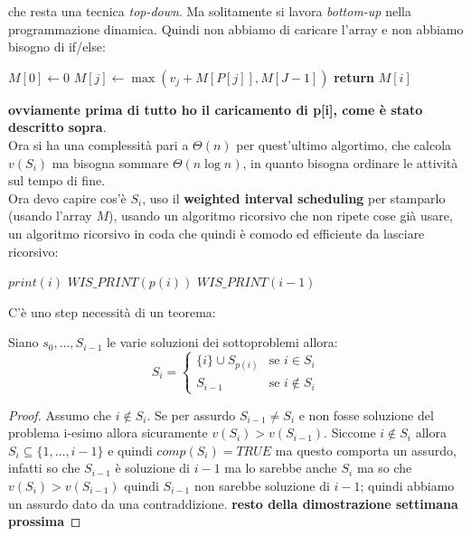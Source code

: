 \documentclass[a4paper,12pt, oneside]{book}
\begin{document}
che resta una tecnica \textit{top-down}. Ma solitamente si lavora
\textit{bottom-up} nella programmazione dinamica. Quindi non abbiamo
di caricare l'array e non abbiamo bisogno di if/else:
\begin{algorithm}
  \begin{algorithmic}
    \State $M[0]\gets 0$
    \State $M[j]\gets\max(v_j+M[P[j]], M[J-1])$
    \EndFor
    \State \textbf{return} $M[i]$
    \EndFunction
  \end{algorithmic}  
\end{algorithm}
\textbf{ovviamente prima di tutto ho il caricamento di p[i], come è
  stato descritto sopra}.\\
Ora si ha una complessità pari a $\Theta(n)$ per quest'ultimo
algortimo, che calcola $v(S_i)$ ma bisogna sommare $\Theta(n\log n)$,
in quanto bisogna ordinare le attività sul tempo di fine.\\
Ora devo capire cos'è $S_i$, uso il \textbf{weighted interval
  scheduling} per stamparlo (usando l'array $M$), usando un algoritmo
ricorsivo che non ripete cose già usare, un algoritmo ricorsivo in
coda che quindi è comodo ed efficiente da lasciare ricorsivo:
\begin{algorithm}
  \begin{algorithmic}
    \State $print(i)$
    \State $WIS\_PRINT(p(i))$
    \Else
    \State $WIS\_PRINT(i-1)$
    \EndIf
    \EndIf
    \EndFunction
  \end{algorithmic}  
\end{algorithm}
C'è uno step necessità di un teorema:
\begin{teorema}
  Siano $s_0,\ldots,S_{i-1}$ le varie soluzioni dei sottoproblemi allora:
  \[
    S_i=\begin{cases}
      \{i\}\cup S_{p(i)} & \mbox{se }i\in S_i\\
      S_{i-1} & \mbox{se } i\not\in S_i
    \end{cases}
  \]
\end{teorema}
\begin{proof}
  Assumo che $i\not\in S_i$. Se per assurdo $S_{i-1}\neq S_i$ e non
  fosse soluzione del problema i-esimo allora sicuramente
  $v(S_i)>v(S_{i-1})$. Siccome $i\not\in S_i$ allora
  $S_i\subseteq\{1,\ldots,i-1\}$ e quindi $comp(S_i)=TRUE$ ma questo
  comporta un assurdo, infatti so che $S_{i-1}$ è soluzione di $i-1$
  ma lo sarebbe anche $S_i$ ma so che $v(S_i)>v(S_{i-1})$ quindi
  $S_{i-1}$ non sarebbe soluzione di $i-1$; quindi abbiamo un assurdo
  dato da una contraddizione.
  \textbf{resto della dimostrazione settimana prossima}
\end{proof}
\end{document}
